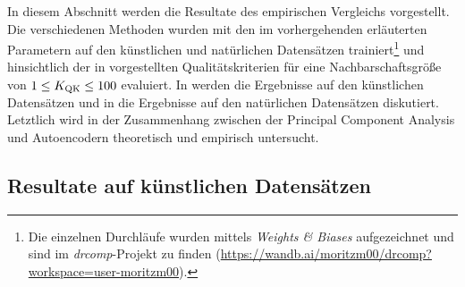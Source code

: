 In diesem Abschnitt werden die Resultate des empirischen Vergleichs vorgestellt. Die verschiedenen
Methoden wurden mit den im vorhergehenden 
erläuterten Parametern auf den künstlichen und natürlichen Datensätzen trainiert\footnote{Die
	einzelnen Durchläufe wurden mittels \textit{Weights \& Biases} aufgezeichnet und sind im
	\textit{drcomp}-Projekt zu finden
	(\url{https://wandb.ai/moritzm00/drcomp?workspace=user-moritzm00}).} und hinsichtlich der in
 vorgestellten Qualitätskriterien für
eine Nachbarschaftsgröße von $1 \leq K_{\text{QK}} \leq 100$ evaluiert. In
 werden die Ergebnisse auf den künstlichen
Datensätzen und in  die Ergebnisse auf den
natürlichen Datensätzen diskutiert. Letztlich wird in 
der Zusammenhang zwischen der Principal Component Analysis und Autoencodern theoretisch und
empirisch untersucht.

\subsection{Resultate auf künstlichen Datensätzen}
\label{ch:Vergleich:sec:Resultate:kuenstlich}


